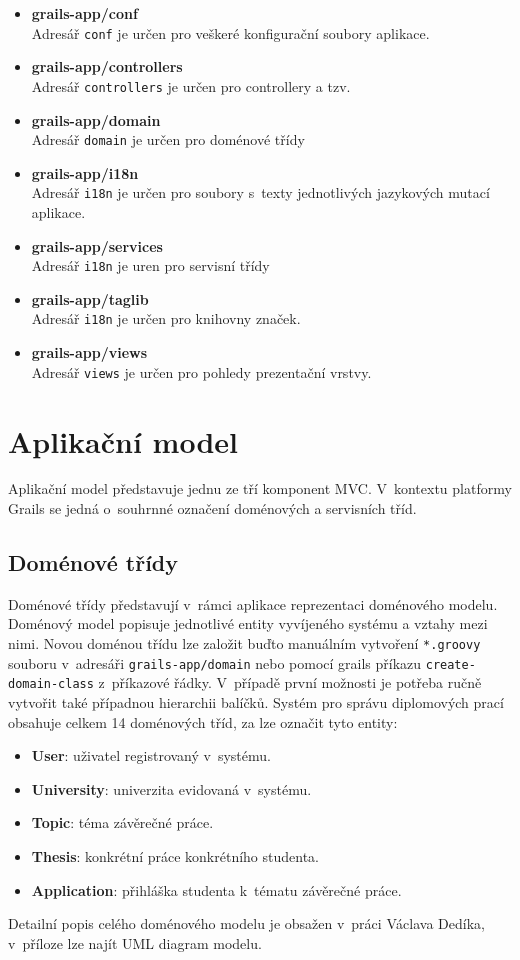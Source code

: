 \begin{itemize}
\item \textbf{grails-app/conf}\\
Adresář \texttt{conf} je určen pro veškeré konfigurační soubory aplikace.
\item \textbf{grails-app/controllers}\\
Adresář \texttt{controllers} je určen pro controllery a tzv. 
\item \textbf{grails-app/domain}\\
Adresář \texttt{domain} je určen pro doménové třídy
\item \textbf{grails-app/i18n}\\
Adresář \texttt{i18n} je určen pro soubory s~texty jednotlivých jazykových mutací aplikace.
\item \textbf{grails-app/services}\\
Adresář \texttt{i18n} je uren pro servisní třídy
\item \textbf{grails-app/taglib}\\
Adresář \texttt{i18n} je určen pro knihovny značek.
\item \textbf{grails-app/views}\\
Adresář \texttt{views} je určen pro pohledy prezentační vrstvy.
\end{itemize}

\section{Aplikační model}
Aplikační model představuje jednu ze tří komponent MVC. V~kontextu platformy Grails se jedná o~souhrnné označení doménových a servisních tříd.

\subsection{Doménové třídy}
Doménové třídy představují v~rámci aplikace reprezentaci doménového modelu. Doménový model popisuje jednotlivé entity vyvíjeného systému a vztahy mezi nimi. Novou doménou třídu lze založit buďto manuálním vytvoření \texttt{*.groovy} souboru v~adresáři \texttt{grails-app/domain} nebo pomocí grails příkazu \texttt{create-domain-class} z~příkazové řádky. V~případě první možnosti je potřeba ručně vytvořit také případnou hierarchii balíčků. Systém pro správu diplomových prací obsahuje celkem 14 doménových tříd, za  lze označit tyto entity:
\begin{itemize}
\item \textbf{User}: uživatel registrovaný v~systému.
\item \textbf{University}: univerzita evidovaná v~systému.
\item \textbf{Topic}: téma závěrečné práce.
\item \textbf{Thesis}: konkrétní práce konkrétního studenta.
\item \textbf{Application}: přihláška studenta k~tématu závěrečné práce.
\end{itemize}
Detailní popis celého doménového modelu je obsažen v~práci Václava Dedíka, v~příloze lze najít UML diagram modelu.


